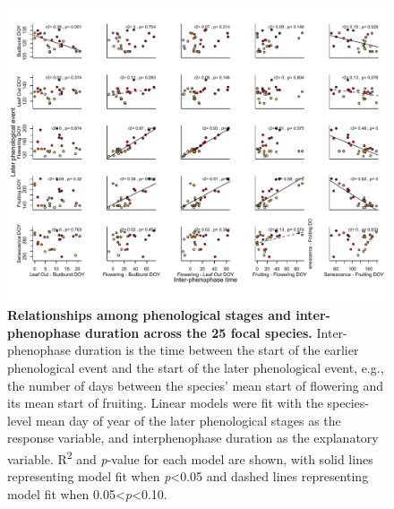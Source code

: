\documentclass{article}
\begin{document}
\begin{figure}[h]
  \centering
  \includegraphics{../analyses/figures/adj_stagesmegaplot_col_YOR.pdf}
  \caption{\textbf{Relationships among phenological stages and inter-phenophase duration across the 25 focal species.} Inter-phenophase duration is the time between the start of the earlier phenological event and the start of the later phenological event, e.g., the number of days between the species' mean start of flowering and its mean start of fruiting. Linear models were fit with the species-level mean day of year of the later phenological stages as the response variable, and interphenophase duration as the explanatory variable. R\textsuperscript{2} and \textit{p}-value for each model are shown, with solid lines representing model fit when \textit{p}<0.05 and dashed lines representing model fit when 0.05<\textit{p}<0.10.}
  \label{fig:inter}
   \end{figure}


\end{document}
